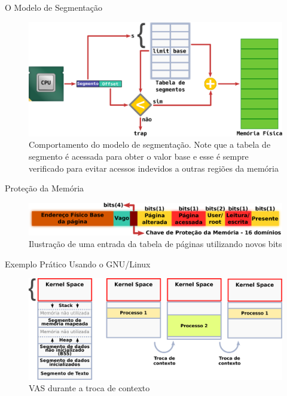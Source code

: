 \documentclass[xcolor={usenames,svgnames,dvipsnames},brazil,english,12pt,aspectratio=149]{beamer}
\begin{document}
\begin{frame}{O Modelo de Segmentação}
  \begin{figure}[!h]
    \centering
    \includegraphics[width=.80\textwidth]{segmentacao} 
    \caption{Comportamento do modelo de segmentação. Note que a tabela de segmento é acessada para obter o valor base e esse é sempre verificado para evitar acessos indevidos a outras regiões da memória}
    \label{fig:segmentacao} 
  \end{figure}
\end{frame}

\begin{frame}{Proteção da Memória}
  \begin{figure}[!h]
    \centering
    \includegraphics[width=.80\textwidth]{pte_domain} 
    \caption{Ilustração de uma entrada da tabela de páginas utilizando novos bits}
    \label{fig:ptedominio} 
  \end{figure}
\end{frame}

\begin{frame}{Exemplo Prático Usando o GNU/Linux}
  \begin{figure}[!h]
    \centering
    \includegraphics[width=\textwidth]{segmento_troca_contexto}
    \caption{VAS durante a troca de contexto}
    \label{fig:vas_contexto}
  \end{figure}
\end{frame}
\end{document}
